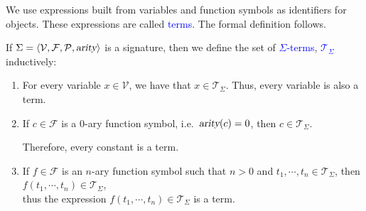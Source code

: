 \noindent
We use expressions built from variables and function symbols as identifiers for objects. These expressions are
called \textcolor{blue}{terms}. The formal definition follows.

\begin{Definition}
  If $\Sigma = \langle \mathcal{V}, \mathcal{F}, \mathcal{P}, \textsl{arity} \rangle$ is a signature, then we define the set of \textcolor{blue}{$\Sigma$-terms},
  \textcolor{blue}{$\mathcal{T}_\Sigma$}  inductively:
  \begin{enumerate}
  \item For every variable $x \in \mathcal{V}$, we have that $x \in \mathcal{T}_\Sigma$. Thus, every variable is also a term.
  \item If $c \in \mathcal{F}$ is a $0$-ary function symbol,
        i.e.~$\textsl{arity}(c) = 0$, then $c \in \mathcal{T}_\Sigma$.

        Therefore, every constant is a term.
  \item If $f \in \mathcal{F}$ is an $n$-ary function symbol such that $n > 0$ and 
        $t_1,\cdots,t_n \in \mathcal{T}_\Sigma$, then 
        \\[0.2cm]
        \hspace*{1.3cm} $f(t_1,\cdots,t_n) \in \mathcal{T}_\Sigma$,
        \\[0.2cm]
        thus the expression $f(t_1,\cdots,t_n) \in \mathcal{T}_\Sigma$ is a term.
        \eox
  \end{enumerate}
\end{Definition}

